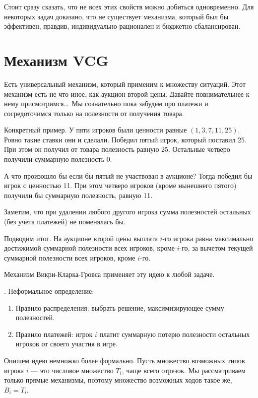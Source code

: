 Стоит сразу сказать, что не всех этих свойств можно добиться одновременно. Для некоторых задач доказано, что не существует механизма, который был бы эффективен, правдив, индивидуально рационален и бюджетно сбалансирован.


\section{Механизм VCG}

Есть универсальный механизм, который применим к множеству ситуаций. Этот механизм есть не что иное, как аукцион второй цены. Давайте повнимательнее к нему присмотримся\ldots~Мы сознательно пока забудем про платежи и сосредоточимся только на полезности от получения товара.



Конкретный пример. У пяти игроков были ценности равные $ (1,3,7,11,25) $. Ровно такие ставки они и сделали. Победил пятый игрок, который поставил 25.  При этом он получил от товара полезность равную 25. Остальные четверо получили суммарную полезность 0.

А что произошло бы если бы пятый не участвовал в аукционе? Тогда победил бы игрок с ценностью 11. При этом четверо игроков (кроме нынешнего пятого) получили бы суммарную полезность, равную 11.

Заметим, что при удалении любого другого игрока сумма полезностей остальных (без учета платежей) не поменялась бы.

Подводим итог. На аукционе второй цены выплата $i$-го игрока равна максимально достижимой суммарной полезности всех игроков, кроме $i$-го, за вычетом текущей суммарной полезности всех игроков, кроме $i$-го.

Механизм Викри-Кларка-Гровса применяет эту идею к любой задаче.

\begin{mydef} . Неформальное определение:
\begin{enumerate}
\item Правило распределения: выбрать решение, максимизирующее сумму полезностей.
\item Правило платежей: игрок $ i $ платит суммарную потерю полезности остальных игроков от своего участия в игре.
\end{enumerate}
\end{mydef}

Опишем идею немножко более формально. Пусть множество возможных типов игрока $ i $ — это числовое множество $ T_{i} $, чаще всего отрезок. Мы рассматриваем только прямые механизмы, поэтому множество возможных ходов такое же, $ B_{i}=T_{i}$.

